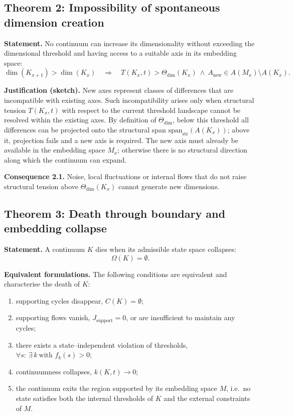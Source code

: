 \subsection{Theorem 2: Impossibility of spontaneous dimension creation}
\label{sec:theorem-spontaneous-dimension-creation}

\textbf{Statement.}
No continuum can increase its dimensionality without exceeding the dimensional threshold and having access to a suitable axis in its embedding space:
\[
    \dim(K_{x+1}) > \dim(K_x)
    \quad\Rightarrow\quad
    T(K_x,t) > \Theta_{\mathrm{dim}}(K_x)
    \ \wedge\
    A_{\mathrm{new}} \in A(M_x)\setminus A(K_x).
\]

\textbf{Justification (sketch).}
New axes represent classes of differences that are incompatible with existing axes.
Such incompatibility arises only when structural tension \(T(K_x,t)\) with respect to the current threshold landscape cannot be resolved within the existing axes.
By definition of \(\Theta_{\mathrm{dim}}\), below this threshold all
differences can be projected onto the structural span
\(\mathrm{span}_{\mathrm{str}}(A(K_x))\); above it, projection fails and a new
axis is required.
The new axis must already be available in the embedding space \(M_x\); otherwise there is no structural direction along which the continuum can expand.

\textbf{Consequence 2.1.}
Noise, local fluctuations or internal flows that do not raise structural tension above \(\Theta_{\mathrm{dim}}(K_x)\) cannot generate new dimensions.

\subsection{Theorem 3: Death through boundary and embedding collapse}

\textbf{Statement.}
A continuum \(K\) dies when its admissible state space collapses:
\[
    \Omega(K) = \emptyset.
\]

\textbf{Equivalent formulations.}
The following conditions are equivalent and characterise the death of \(K\):
\begin{enumerate}
    \item supporting cycles disappear, \(C(K) = \emptyset\);
    \item supporting flows vanish, \(J_{\mathrm{support}} = 0\), or are insufficient to maintain any cycles;
    \item there exists a state–independent violation of thresholds, \(\forall s:\ \exists\,k\ \text{with } f_k(s) > 0\);
    \item continuumness collapses, \(k(K,t) \to 0\);
    \item the continuum exits the region supported by its embedding space \(M\), i.e.\ no state satisfies both the internal thresholds of \(K\) and the external constraints of \(M\).
\end{enumerate}

